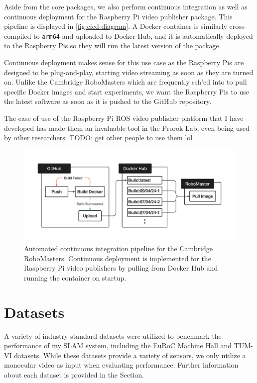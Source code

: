 Aside from the core packages, we also perform continuous integration as well as continuous deployment for the Raspberry Pi video publisher package. This pipeline is displayed in \autoref{fig:cicd-diagram}. A Docker container is similarly cross-compiled to \texttt{arm64} and uploaded to Docker Hub, and it is automatically deployed to the Raspberry Pis so they will run the latest version of the package.

Continuous deployment makes sense for this use case as the Raspberry Pis are designed to be plug-and-play, starting video streaming as soon as they are turned on. Unlike the Cambridge RoboMasters which are frequently ssh'ed into to pull specific Docker images and start experiments, we want the Raspberry Pis to use the latest software as soon as it is pushed to the GitHub repository.

The ease of use of the Raspberry Pi ROS video publisher platform that I have developed has made them an invaluable tool in the Prorok Lab, even being used by other researchers. TODO: get other people to use them lol

\begin{figure}[h]
    \centering
    \includegraphics[trim=5cm 5cm 5cm 5cm, scale=0.2]{figures/cicd_diagram.pdf}

    \caption{Automated continuous integration pipeline for the Cambridge RoboMasters. Continuous deployment is implemented for the Raspberry Pi video publishers by pulling from Docker Hub and running the container on startup.}
    \label{fig:cicd-diagram}
\end{figure}


\section{Datasets}
\label{sec:datasets}
A variety of industry-standard datasets were utilized to benchmark the performance of my SLAM system, including the EuRoC Machine Hall \autocite{burri2016euroc} and TUM-VI \autocite{8593419} datasets. While these datasets provide a variety of sensors, we only utilize a monocular video as input when evaluating performance. Further information about each dataset is provided in the  Section.

